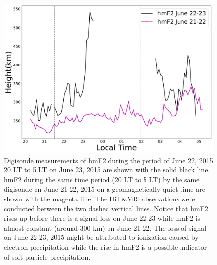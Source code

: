 \documentclass[crop=false,class=mitthesis,oneside,font=12pt]{standalone}
\begin{document}

\begin{figure}[H]
	\centering\includegraphics[width=30pc]{digi.pdf}
	\caption{ Digisonde measurements of hmF2 during the period of June 22, 2015 20 LT to 5 LT on June 23, 2015 are shown with the solid black line.
		hmF2 during the same time period (20 LT to 5 LT) by the same digisonde on June 21-22, 2015 on a geomagnetically quiet time are shown with the magenta line.
		The  HiT\&MIS observations were conducted between the two dashed vertical lines. Notice that hmF2 rises up before there is a signal loss on June 22-23 while hmF2 is almost constant (around 300 km) on June 21-22. The loss of signal on June 22-23, 2015 might be attributed to ionization caused by electron precipitation while the rise in hmF2 is a possible indicator of soft particle precipitation. 
	}
	\label{fig:digi}
\end{figure}
\end{document}
